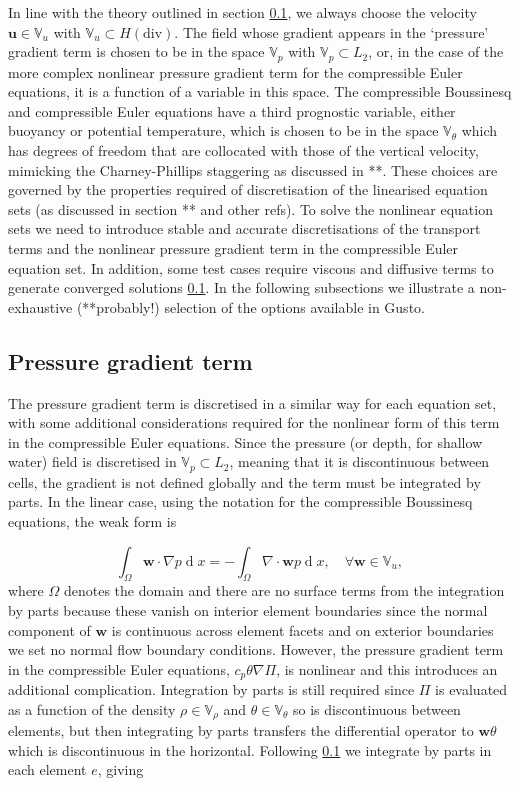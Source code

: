 \documentclass[journal abbreviation, manuscript]{copernicus}
\def\MM#1{\boldsymbol{#1}}
\DeclareMathOperator{\diff}{d}
\begin{document}
In line with the theory outlined in section \ref{}, we always choose
the velocity $\MM{u} \in \mathbb{V}_u$ with $\mathbb{V}_u \subset
H(\text{div})$. The field whose gradient appears in the `pressure'
gradient term is chosen to be in the space $\mathbb{V}_p$ with
$\mathbb{V}_p \subset L_2$, or, in the case of the more complex
nonlinear pressure gradient term for the compressible Euler equations,
it is a function of a variable in this space. The compressible
Boussinesq and compressible Euler equations have a third prognostic
variable, either buoyancy or potential temperature, which is chosen to
be in the space $\mathbb{V}_\theta$ which has degrees of freedom that
are collocated with those of the vertical velocity, mimicking the
Charney-Phillips staggering as discussed in **. These choices are
governed by the properties required of discretisation of the
linearised equation sets (as discussed in section ** and other
refs). To solve the nonlinear equation sets we need to introduce
stable and accurate discretisations of the transport terms and the
nonlinear pressure gradient term in the compressible Euler equation
set. In addition, some test cases require viscous and diffusive terms
to generate converged solutions \ref{}. In the following subsections
we illustrate a non-exhaustive (**probably!) selection of the options
available in Gusto.

\subsection{Pressure gradient term}
The pressure gradient term is discretised in a similar way for each
equation set, with some additional considerations required for the
nonlinear form of this term in the compressible Euler equations. Since
the pressure (or depth, for shallow water) field is discretised in
$\mathbb{V}_p \subset L_2$, meaning that it is discontinuous between
cells, the gradient is not defined globally and the term must be
integrated by parts. In the linear case, using the notation for the
compressible Boussinesq equations, the weak form is

\begin{equation}
\int_\Omega\MM{w}\cdot\nabla p \diff x = -\int_\Omega\nabla\cdot\MM{w}p\diff x, \quad \forall \MM{w} \in \mathbb{V}_u,
\end{equation}
where $\Omega$ denotes the domain and there are no surface terms from
the integration by parts because these vanish on interior element
boundaries since the normal component of $\MM{w}$ is continuous across
element facets and on exterior boundaries we set no normal flow
boundary conditions. However, the pressure gradient term in the
compressible Euler equations, $c_p\theta\nabla\Pi$, is nonlinear and
this introduces an additional complication. Integration by parts is
still required since $\Pi$ is evaluated as a function of the density
$\rho \in \mathbb{V}_\rho$ and $\theta \in \mathbb{V}_\theta$ so is
discontinuous between elements, but then integrating by parts
transfers the differential operator to $\MM{w}\theta$ which is
discontinuous in the horizontal. Following \ref{} we integrate by parts
in each element $e$, giving
\end{document}
